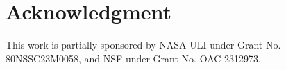 \documentclass[conference]{IEEEtran}
\begin{document}


\section*{Acknowledgment}
This work is partially sponsored by NASA ULI under Grant No. 80NSSC23M0058, and NSF under Grant No. OAC-2312973.










%






\end{document}
